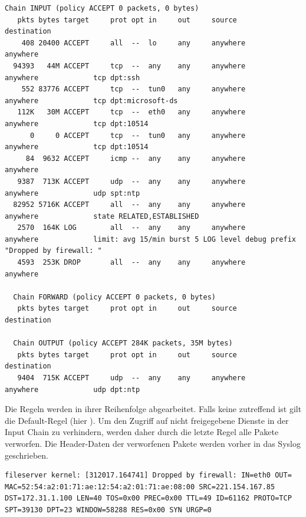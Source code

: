 \begin{lstlisting}[label=code:smbconf5,caption=Ausgabe von iptables -L -v]
  Chain INPUT (policy ACCEPT 0 packets, 0 bytes)
   pkts bytes target     prot opt in     out     source               destination         
    408 20400 ACCEPT     all  --  lo     any     anywhere             anywhere            
  94393   44M ACCEPT     tcp  --  any    any     anywhere             anywhere             tcp dpt:ssh
    552 83776 ACCEPT     tcp  --  tun0   any     anywhere             anywhere             tcp dpt:microsoft-ds
   112K   30M ACCEPT     tcp  --  eth0   any     anywhere             anywhere             tcp dpt:10514
      0     0 ACCEPT     tcp  --  tun0   any     anywhere             anywhere             tcp dpt:10514
     84  9632 ACCEPT     icmp --  any    any     anywhere             anywhere            
   9387  713K ACCEPT     udp  --  any    any     anywhere             anywhere             udp spt:ntp
  82952 5716K ACCEPT     all  --  any    any     anywhere             anywhere             state RELATED,ESTABLISHED
   2570  164K LOG        all  --  any    any     anywhere             anywhere             limit: avg 15/min burst 5 LOG level debug prefix "Dropped by firewall: "
   4593  253K DROP       all  --  any    any     anywhere             anywhere            
  
  Chain FORWARD (policy ACCEPT 0 packets, 0 bytes)
   pkts bytes target     prot opt in     out     source               destination         
  
  Chain OUTPUT (policy ACCEPT 284K packets, 35M bytes)
   pkts bytes target     prot opt in     out     source               destination         
   9404  715K ACCEPT     udp  --  any    any     anywhere             anywhere             udp dpt:ntp
\end{lstlisting}

Die Regeln werden in ihrer Reihenfolge abgearbeitet. Falls keine zutreffend ist gilt die Default-Regel (hier ). Um den Zugriff auf nicht freigegebene Dienste in der Input Chain zu verhindern, werden daher durch die letzte Regel alle Pakete verworfen. Die Header-Daten der verworfenen Pakete werden vorher in das Syslog geschrieben.

\begin{lstlisting}[label=code:denyany,caption=Syslog Eintrag bei verworfenen Paketen]
  fileserver kernel: [312017.164741] Dropped by firewall: IN=eth0 OUT= MAC=52:54:a2:01:71:ae:12:54:a2:01:71:ae:08:00 SRC=221.154.167.85 DST=172.31.1.100 LEN=40 TOS=0x00 PREC=0x00 TTL=49 ID=61162 PROTO=TCP SPT=39130 DPT=23 WINDOW=58288 RES=0x00 SYN URGP=0
\end{lstlisting}

